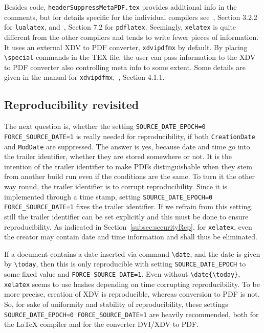 \documentclass[a4paper]{article}%
\newcommand{\pdflatex}{\texttt{pdflatex}}
\newcommand{\lualatex}{\texttt{lualatex}}
\newcommand{\xelatex}{\texttt{xelatex}}
\newcommand{\cmd}[1]{\texttt{\textbackslash#1}}
\begin{document}
Besides code, \texttt{headerSuppressMetaPDF.tex} provides 
additional info in the comments, 
but for details specific for the individual compilers 
see~\cite{LuaTexRef}, Section 3.2.2 for \lualatex, 
and~\cite{PdfTexUsr}, Section 7.2 for \pdflatex. 
Seemingly, \xelatex{} is quite different from the other compilers 
and tends to write fewer pieces of information. 
It uses an external XDV to PDF converter, \texttt{xdvipdfmx} by default. 
By placing \cmd{special} commands in the TEX file, 
the user can pass information to the XDV to PDF converter 
also controlling meta info to some extent. 
Some details are given in the 
manual for \texttt{xdvipdfmx},~\cite{DviPdfMx}, Section 4.1.1. 


\subsection{Reproducibility revisited}\label{subsec:reprod2}

The next question is, 
whether the setting \texttt{SOURCE\_DATE\_EPOCH=0 FORCE\_SOURCE\_DATE=1} 
is really needed for reproducibility, 
if both \texttt{CreationDate} and \texttt{ModDate} are suppressed. 
The answer is yes, because date and time go into the trailer identifier, 
whether they are stored somewhere or not. 
It is the intention of the trailer identifier to make PDFs distinguishable 
when they stem from another build run even if the conditions are the same. 
To turn it the other way round, the trailer identifier 
is to corrupt reproducibility. 
Since it is implemented through a time stamp, 
setting \texttt{SOURCE\_DATE\_EPOCH=0 FORCE\_SOURCE\_DATE=1} 
fixes the trailer identifier. 
If we refrain from this setting, 
still the trailer identifier can be set explicitly 
and this must be done to ensure reproducibility. 
As indicated in Section~\ref{subsec:securityRep}, 
for \xelatex, even the creator may contain date and time information 
and shall thus be eliminated. 

If a document contains a date inserted via command \cmd{date}, 
and the date is given by \cmd{today}, 
then this is only reproducible 
with setting \texttt{SOURCE\_DATE\_EPOCH} to some fixed value and \texttt{FORCE\_SOURCE\_DATE=1}. 
Even without \cmd{date\{\cmd{today}\}}, \xelatex{} seems to use hashes depending on time 
corrupting reproducibility. 
To be more precise, creation of XDV is reproducible, 
whereas conversion to PDF is not. 
So, for sake of uniformity and stability of reproducibility, 
these settings \texttt{SOURCE\_DATE\_EPOCH=0 FORCE\_SOURCE\_DATE=1} are heavily recommended, 
both for the \LaTeX{} compiler and for the converter DVI/XDV to PDF\@. 
\end{document}
